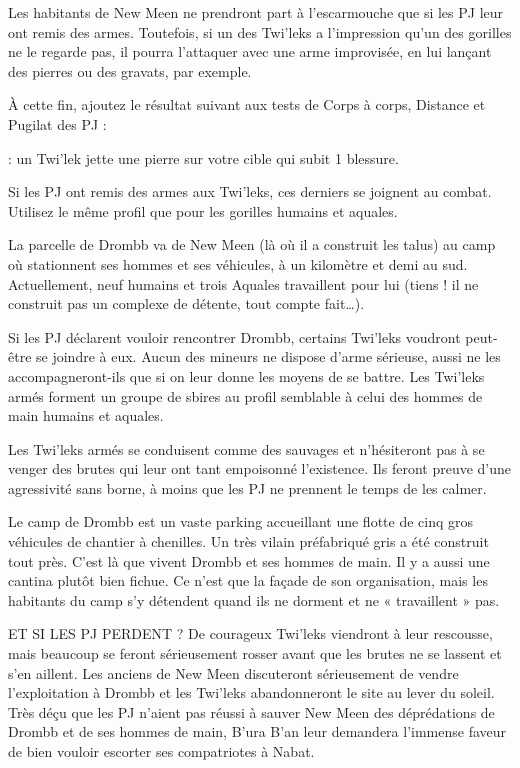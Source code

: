 \documentclass[a4paper,10pt,twoside,twocolumn,openany]{book}
\begin{document}
Les habitants de New Meen ne prendront part à l’escarmouche que si les PJ leur ont remis des armes. Toutefois, si un des Twi’leks a l’impression qu’un des gorilles
ne le regarde pas, il pourra l’attaquer avec une arme
improvisée, en lui lançant des pierres ou des gravats,
par exemple.

À cette fin, ajoutez le résultat suivant aux tests de
Corps à corps, Distance et Pugilat des PJ :

\advantage : un Twi’lek jette une pierre sur votre cible qui
subit 1 blessure.

Si les PJ ont remis des armes aux Twi’leks, ces derniers se joignent au combat. Utilisez le même profil que
pour les gorilles humains et aquales.

\subtitle{SUS À DROMBB !}

La parcelle de Drombb va de New Meen (là où il a
construit les talus) au camp où stationnent ses hommes
et ses véhicules, à un kilomètre et demi au sud. Actuellement, neuf humains et trois Aquales travaillent pour lui
(tiens ! il ne construit pas un complexe de détente, tout
compte fait…).

Si les PJ déclarent vouloir rencontrer Drombb, certains
Twi’leks voudront peut-être se joindre à eux. Aucun des
mineurs ne dispose d’arme sérieuse, aussi ne les accompagneront-ils que si on leur donne les moyens de se
battre. Les Twi’leks armés forment un groupe de sbires
au profil semblable à celui des hommes de main humains
et aquales.

Les Twi’leks armés se conduisent comme des sauvages et n’hésiteront pas à se venger des brutes qui leur
ont tant empoisonné l’existence. Ils feront preuve d’une
agressivité sans borne, à moins que les PJ ne prennent
le temps de les calmer.

Le camp de Drombb est un vaste parking accueillant
une flotte de cinq gros véhicules de chantier à chenilles. Un très vilain préfabriqué gris a été construit
tout près. C’est là que vivent Drombb et ses hommes
de main. Il y a aussi une cantina plutôt bien fichue. Ce
n’est que la façade de son organisation, mais les habitants du camp s’y détendent quand ils ne dorment et
ne « travaillent » pas.







\begin{commentbox}{ET SI LES PJ PERDENT ?}
  De courageux Twi’leks viendront à leur rescousse,
mais beaucoup se feront sérieusement rosser
avant que les brutes ne se lassent et s’en aillent.
Les anciens de New Meen discuteront sérieusement de vendre l’exploitation à Drombb et les
Twi’leks abandonneront le site au lever du soleil.
Très déçu que les PJ n’aient pas réussi à sauver
New Meen des déprédations de Drombb et de
ses hommes de main, B’ura B’an leur demandera l’immense faveur de bien vouloir escorter ses
compatriotes à Nabat.
\end{commentbox}
\end{document}
